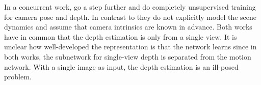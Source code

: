 			In a concurrent work, \cite{zhou2017unsupervised} go a step further and do completely unsupervised training for camera pose and depth.
			In contrast to \citeauthor{SFMNET} they do not explicitly model the scene dynamics and assume that camera intrinsics are known in advance.
			Both works have in common that the depth estimation is only from a single view.
			It is unclear how well-developed the representation is that the network learns since in both works, the subnetwork for single-view depth is separated from the motion network.
			With a single image as input, the depth estimation is an ill-posed problem.
			
			
			


